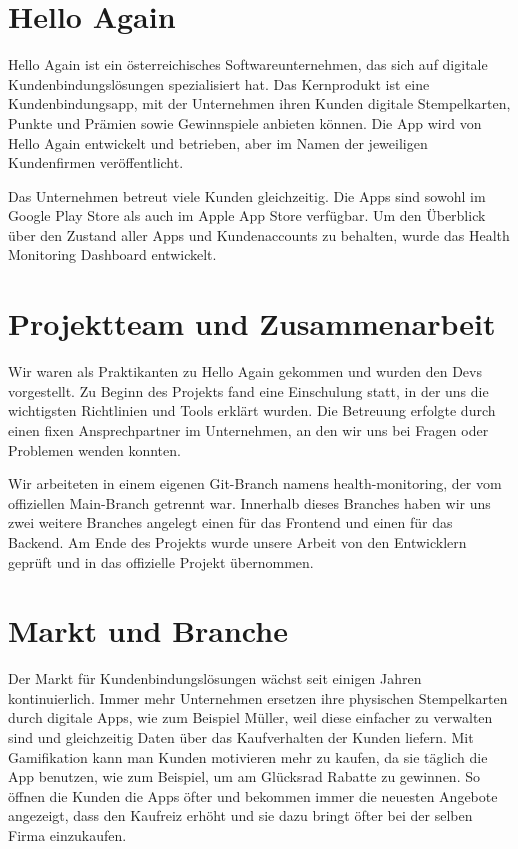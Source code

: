 \section{Hello Again}

Hello Again ist ein österreichisches Softwareunternehmen, das sich auf digitale Kundenbindungslösungen spezialisiert hat.
Das Kernprodukt ist eine Kundenbindungsapp, mit der Unternehmen ihren Kunden digitale Stempelkarten, Punkte und Prämien sowie Gewinnspiele anbieten können.
Die App wird von Hello Again entwickelt und betrieben, aber im Namen der jeweiligen Kundenfirmen veröffentlicht.


Das Unternehmen betreut viele Kunden gleichzeitig.
Die Apps sind sowohl im Google Play Store als auch im Apple App Store verfügbar.
Um den Überblick über den Zustand aller Apps und Kundenaccounts zu behalten, wurde das Health Monitoring Dashboard entwickelt.

\cite{helloagain}


\section{Projektteam und Zusammenarbeit}

Wir waren als Praktikanten zu Hello Again gekommen und wurden den Devs vorgestellt.
Zu Beginn des Projekts fand eine Einschulung statt, in der uns die wichtigsten Richtlinien und Tools erklärt wurden.
Die Betreuung erfolgte durch einen fixen Ansprechpartner im Unternehmen, an den wir uns bei Fragen oder Problemen wenden konnten.


Wir arbeiteten in einem eigenen Git-Branch namens health-monitoring, der vom offiziellen Main-Branch getrennt war.
Innerhalb dieses Branches haben wir uns zwei weitere Branches angelegt einen für das Frontend und einen für das Backend.
Am Ende des Projekts wurde unsere Arbeit von den Entwicklern geprüft und in das offizielle Projekt übernommen.


\section{Markt und Branche}

Der Markt für Kundenbindungslösungen wächst seit einigen Jahren kontinuierlich.
Immer mehr Unternehmen ersetzen ihre physischen Stempelkarten durch digitale Apps, wie zum Beispiel Müller, weil diese einfacher zu verwalten sind und gleichzeitig Daten über das Kaufverhalten der Kunden liefern.
Mit Gamifikation kann man Kunden motivieren mehr zu kaufen, da sie täglich die App benutzen, wie zum Beispiel, um am Glücksrad Rabatte zu gewinnen.
So öffnen die Kunden die Apps öfter und bekommen immer die neuesten Angebote angezeigt, dass den Kaufreiz erhöht und sie dazu bringt öfter bei der selben Firma einzukaufen.


\cite{helloagain}



